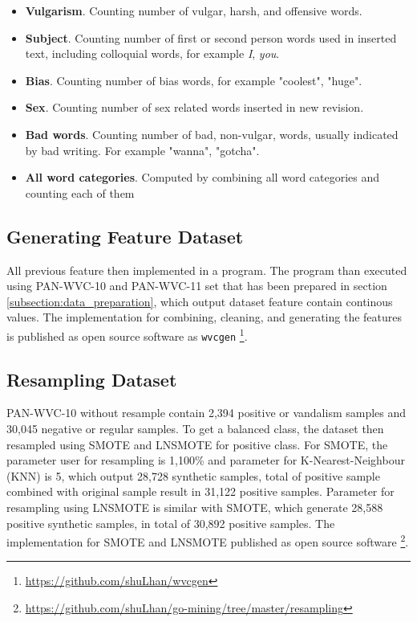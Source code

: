 \documentclass[conference,compsoc,a4paper,twocolumn,final]{IEEEtran}
\begin{document}
\begin{itemize}
\item \textbf{Vulgarism}. Counting number of vulgar, harsh, and offensive
words.
\item \textbf{Subject}. Counting number of first or second person
words used in inserted text, including colloquial words, for example
\textit{I}, \textit{you}.
\item \textbf{Bias}. Counting number of bias words, for example "coolest",
"huge".
\item \textbf{Sex}. Counting number of sex related words inserted in new
revision.
\item \textbf{Bad words}. Counting number of bad, non-vulgar, words, usually
indicated by bad writing. For example "wanna", "gotcha".
\item \textbf{All word categories}. Computed by combining all word categories
and counting each of them
\end{itemize}


\subsection{Generating Feature Dataset}

All previous feature then implemented in a program.
The program than executed using PAN-WVC-10 and PAN-WVC-11 set that has been
prepared in section \ref{subsection:data_preparation}, which output dataset
feature contain continous values.
The implementation for combining, cleaning, and generating the features is
published as open source software as \texttt{wvcgen}
\footnote{\url{https://github.com/shuLhan/wvcgen}}.


\subsection{Resampling Dataset}

PAN-WVC-10 without resample contain 2,394 positive or vandalism samples and
30,045 negative or regular samples.
To get a balanced class, the dataset then resampled using SMOTE and LNSMOTE for
positive class.
For SMOTE, the parameter user for resampling is 1,100\% and parameter for
K-Nearest-Neighbour (KNN) is 5, which output 28,728 synthetic samples, total of
positive sample combined with original sample result in 31,122 positive
samples.
Parameter for resampling using LNSMOTE is similar with SMOTE, which generate
28,588 positive synthetic samples, in total of 30,892 positive samples.
The implementation for SMOTE and LNSMOTE published as open source software
\footnote{\url{https://github.com/shuLhan/go-mining/tree/master/resampling}}.
\end{document}
